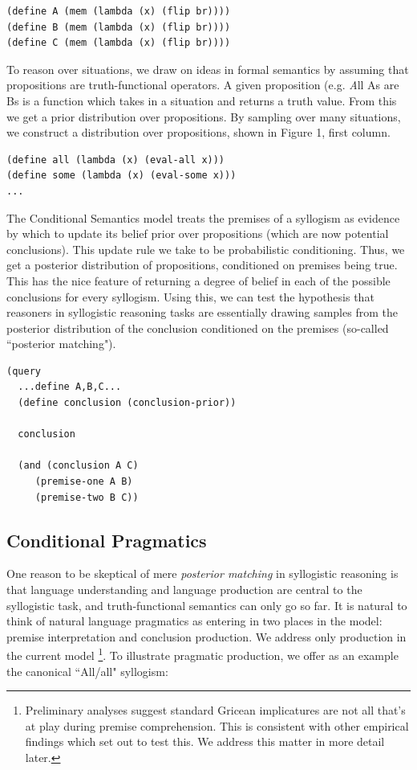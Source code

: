 \documentclass[10pt,letterpaper]{article}
\begin{document}
\begin{lstlisting}
(define A (mem (lambda (x) (flip br))))
(define B (mem (lambda (x) (flip br))))
(define C (mem (lambda (x) (flip br))))
\end{lstlisting}


To reason over situations, we draw on ideas in formal semantics by assuming that propositions are truth-functional operators. A given proposition (e.g. {\emph All As are Bs} is a function which takes in a situation and returns a truth value. From this we get a prior distribution over propositions. By sampling over many situations, we construct a distribution over propositions, shown in Figure 1, first column.

\begin{lstlisting}
(define all (lambda (x) (eval-all x)))
(define some (lambda (x) (eval-some x)))
...
\end{lstlisting}

The Conditional Semantics model treats the premises of a syllogism as evidence by which to update its belief prior over propositions (which are now potential conclusions). This update rule we take to be probabilistic conditioning. Thus, we get a posterior distribution of propositions, conditioned on premises being true. This has the nice feature of returning a degree of belief in each of the possible conclusions for every syllogism. Using this, we can test the hypothesis that reasoners in syllogistic reasoning tasks are essentially drawing samples from the posterior distribution of the conclusion conditioned on the premises (so-called ``posterior matching")\cite{Griffiths2006}.

\begin{lstlisting}
(query
  ...define A,B,C...
  (define conclusion (conclusion-prior))
  
  conclusion
  
  (and (conclusion A C)
  	 (premise-one A B)
     (premise-two B C))
\end{lstlisting}


\subsection{Conditional Pragmatics}
One reason to be skeptical of mere \emph{posterior matching} in syllogistic reasoning is that language understanding and language production are central to the syllogistic task, and truth-functional semantics can only go so far. It is natural to think of natural language pragmatics as entering in two places in the model: premise interpretation and conclusion production. We address only production in the current model \footnote{Preliminary analyses suggest standard Gricean implicatures are not all that's at play during premise comprehension. This is consistent with other empirical findings which set out to test this. We address this matter in more detail later.}. To illustrate pragmatic production, we offer as an example the canonical ``All/all" syllogism:
\end{document}

